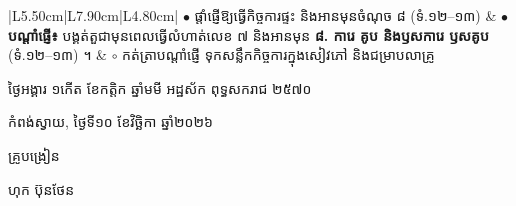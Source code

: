 \documentclass[a4paper,10pt]{article}
\begin{document}
{\begin{longtable}{|L{5.50cm}|L{7.90cm}|L{4.80cm}|}
$\bullet$ ផ្ដាំផ្ញើឱ្យធ្វើកិច្ចការផ្ទះ និងអានមុនចំណុច ៨ (ទំ.១២–១៣)
&
$\bullet$ \textbf{បណ្ដាំផ្ញើ៖} បង្គត់តួជាមុនពេលធ្វើលំហាត់លេខ ៧ និងអានមុន \textbf{៨. ការេ គូប និងឫសការេ ឫសគូប} (ទំ.១២–១៣) ។
&
$\circ$ កត់ត្រាបណ្ដាំផ្ញើ ទុកសន្លឹកកិច្ចការក្នុងសៀវភៅ និងជម្រាបលាគ្រូ \\
\hline
\end{longtable}}

\vspace{6pt}
{\centering
\hspace*{5.2cm}\begin{minipage}{11.5cm}
  \centering
  ថ្ងៃអង្គារ ១កើត ខែកត្តិក ឆ្នាំមមី អដ្ឋស័ក ពុទ្ធសករាជ ២៥៧០\par
  កំពង់ស្វាយ, ថ្ងៃទី១០ ខែវិច្ឆិកា ឆ្នាំ២០២៦\par
  \vspace{2pt}
  {\muol គ្រូបង្រៀន\par}
  \vspace{32pt}
  \hfill{\muol ហុក ប៊ុនថែន}\hspace*{1.4cm}
\end{minipage}\par}
\end{document}
